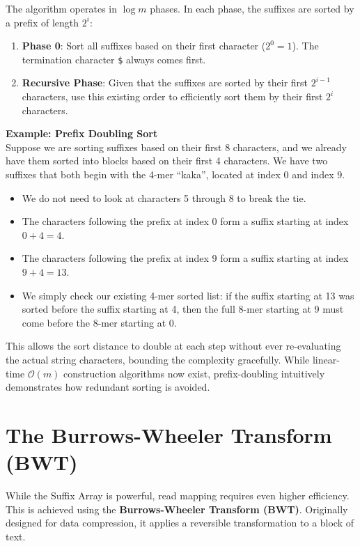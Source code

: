 The algorithm operates in \( \log m \) phases. In each phase, the suffixes are sorted by a prefix of length \( 2^i \):
\begin{enumerate}
    \item \textbf{Phase 0}: Sort all suffixes based on their first character (\( 2^0 = 1 \)). The termination character \verb|$| always comes first.
    \item \textbf{Recursive Phase}: Given that the suffixes are sorted by their first \( 2^{i-1} \) characters, use this existing order to efficiently sort them by their first \( 2^i \) characters.
\end{enumerate}

\textbf{Example: Prefix Doubling Sort}\\
Suppose we are sorting suffixes based on their first 8 characters, and we already have them sorted into blocks based on their first 4 characters. We have two suffixes that both begin with the 4-mer ``kaka'', located at index 0 and index 9.
\begin{itemize}
    \item We do not need to look at characters 5 through 8 to break the tie.
    \item The characters following the prefix at index 0 form a suffix starting at index \( 0 + 4 = 4 \).
    \item The characters following the prefix at index 9 form a suffix starting at index \( 9 + 4 = 13 \).
    \item We simply check our existing 4-mer sorted list: if the suffix starting at 13 was sorted before the suffix starting at 4, then the full 8-mer starting at 9 must come before the 8-mer starting at 0.
\end{itemize}
This allows the sort distance to double at each step without ever re-evaluating the actual string characters, bounding the complexity gracefully. While linear-time \( \mathcal{O}(m) \) construction algorithms now exist, prefix-doubling intuitively demonstrates how redundant sorting is avoided.

\section{The Burrows-Wheeler Transform (BWT)}

While the Suffix Array is powerful, read mapping requires even higher efficiency. This is achieved using the \textbf{Burrows-Wheeler Transform (BWT)}. Originally designed for data compression, it applies a reversible transformation to a block of text. 

